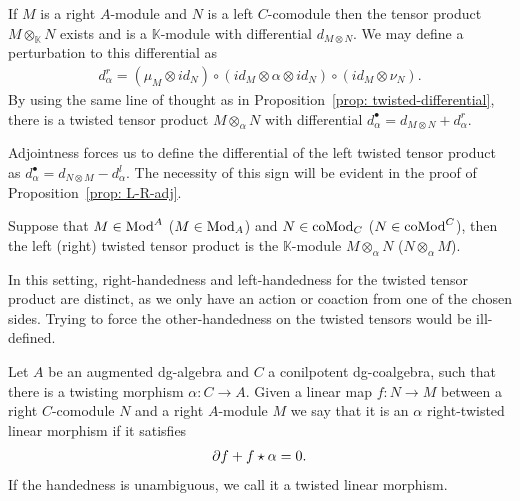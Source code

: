 \documentclass[../thesis.tex]{subfiles}
\begin{document}
            If $M$ is a right $A$-module and $N$ is a left $C$-comodule then the tensor product $M\otimes_\mathbb{K} N$ exists and is a $\mathbb{K}$-module with differential $d_{M\otimes N}$. We may define a perturbation to this differential as 
            \begin{align*}
                d_\alpha^r = (\mu_M\otimes id_N) \circ (id_M \otimes \alpha \otimes id_N) \circ (id_M \otimes \nu_N).
            \end{align*}
            By using the same line of thought as in Proposition~\ref{prop: twisted-differential}, there is a twisted tensor product $M\otimes_\alpha N$ with differential $d_\alpha^\bullet = d_{M\otimes N} + d_\alpha^r$.

            \begin{remark}
                Adjointness forces us to define the differential of the left twisted tensor product as $d_\alpha^\bullet = d_{N\otimes M} - d_\alpha^l$. The necessity of this sign will be evident in the proof of Proposition~\ref{prop: L-R-adj}. 
            \end{remark}
            
            \begin{definition}
                Suppose that $M\in \tt{Mod}^A$ ($M\in \tt{Mod}_A$) and $N\in \tt{coMod}_C$ ($N\in \tt{coMod}^C$), then the left (right) twisted tensor product is the $\mathbb{K}$-module $M\otimes_\alpha N$ ($N\otimes_\alpha M$).
            \end{definition}

            In this setting, right-handedness and left-handedness for the twisted tensor product are distinct, as we only have an action or coaction from one of the chosen sides. Trying to force the other-handedness on the twisted tensors would be ill-defined.

            \begin{definition}
                Let $A$ be an augmented dg-algebra and $C$ a conilpotent dg-coalgebra, such that there is a twisting morphism $\alpha: C\rightarrow A$. Given a linear map $f: N \rightarrow M$ between a right $C$-comodule $N$ and a right $A$-module $M$ we say that it is an $\alpha$ right-twisted linear morphism if it satisfies
                \begin{align*}
                    \partial f + f\star \alpha = 0\tt{.}
                \end{align*}
                If the handedness is unambiguous, we call it a twisted linear morphism.
            \end{definition}
\end{document}
